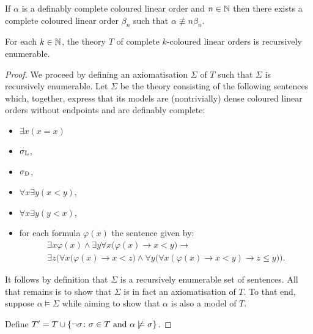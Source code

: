 \begin{prp}
	If $\alpha$ is a definably complete coloured linear order and $n\in\mathbb{N}$ then there exists a complete coloured linear order $\beta_n$ such that $\alpha\nequiv{n}\beta_n$.
\end{prp}

\begin{prp}
	For each $k\in\mathbb{N}$, the theory $T$ of complete $k$-coloured linear orders is recursively enumerable.
\end{prp}
\begin{proof}
	We proceed by defining an axiomatisation $\Sigma$ of $T$ such that $\Sigma$ is recursively enumerable.  Let $\Sigma$ be the theory consisting of the following sentences which, together, express that its models are (nontrivially) dense coloured linear orders without endpoints and are definably complete:
	\begin{itemize}
		\item	$\exists x(x=x)$
		\item	$\sigma_{\mathrm{L}}$,
		\item	$\sigma_{\mathrm{D}}$,
		\item	$\forall x\exists y(x<y)$,
		\item	$\forall x\exists y(y<x)$,
		\item	for each formula $\varphi(x)$ the sentence given by:
			\begin{multline}
				\exists x\varphi(x)\wedge\exists y\forall x\big(\varphi(x)\rightarrow x<y\big)\rightarrow\\
				\exists z\Big(\forall x\big(\varphi (x)\rightarrow x<z\big)\wedge\forall y\big(\forall x(\varphi(x)\rightarrow x<y)\rightarrow z\leq y\big)\Big).
			\end{multline}
	\end{itemize}

	It follows by definition that $\Sigma$ is a recursively enumerable set of sentences.  All that remains is to show that $\Sigma$ is in fact an axiomatisation of $T$.  To that end, suppose $\alpha\models\Sigma$ while aiming to show that $\alpha$ is also a model of $T$.

	Define $T^\prime=T\cup\left\lbrace \neg\sigma\colon \sigma\in T\text{ and }\alpha\not\models\sigma \right\rbrace$.
\end{proof}
